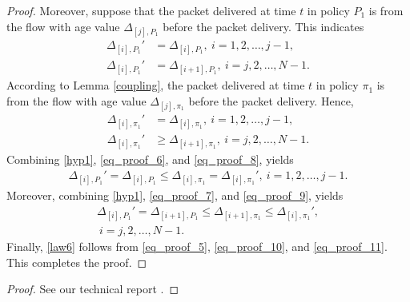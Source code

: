 \begin{proof}
Moreover, suppose that the packet delivered at time $t$ in policy $P_1$ is from the flow with age value $\Delta_{[j],P_1}$ before the packet delivery. This indicates 
\begin{align}
\Delta_{[i],P_1}' &= \Delta_{[i],P_1},~i=1,2,\ldots, j -1, \label{eq_proof_6}\\
\Delta_{[i],P_1}'& = \Delta_{[i+1],P_1},~i=j,2,\ldots, N-1. \label{eq_proof_7}
\end{align}
According to Lemma \ref{coupling}, the packet delivered at time $t$ in policy $\pi_1$ is from the flow with age value $\Delta_{[j],\pi_1}$ before the packet delivery. Hence, 
\begin{align}
\Delta_{[i],\pi_1}' &= \Delta_{[i],\pi_1},~i=1,2,\ldots, j -1, \label{eq_proof_8}\\
\Delta_{[i],\pi_1}'& \geq \Delta_{[i+1],\pi_1},~i=j,2,\ldots, N-1. \label{eq_proof_9}
\end{align}
Combining \eqref{hyp1}, \eqref{eq_proof_6}, and \eqref{eq_proof_8}, yields
\begin{align}
\Delta_{[i],P_1}' = \Delta_{[i],P_1} \leq \Delta_{[i],\pi_1} = \Delta_{[i],\pi_1}',~i=1,2,\ldots, j -1.\label{eq_proof_10}
\end{align}
Moreover, combining \eqref{hyp1}, \eqref{eq_proof_7}, and \eqref{eq_proof_9}, yields
\begin{align}
\Delta_{[i],P_1}' = \Delta_{[i+1],P_1} \leq \Delta_{[i+1],\pi_1} \leq \Delta_{[i],\pi_1}',\nonumber\\~i=j,2,\ldots, N-1.\label{eq_proof_11}
\end{align}
Finally, \eqref{law6} follows from \eqref{eq_proof_5}, \eqref{eq_proof_10}, and \eqref{eq_proof_11}. This completes the proof. 
\end{proof}
\else
\begin{proof}
See our technical report \cite{SunMultiFlow18}.
\end{proof}
\fi

